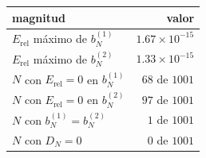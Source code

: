 \begin{tabular}{lr}
\toprule
magnitud & valor \\
\midrule
$E_\mathrm{rel}$ máximo de $b_N^{(1)}$ & $1.67 \times 10^{-15}$ \\
$E_\mathrm{rel}$ máximo de $b_N^{(2)}$ & $1.33 \times 10^{-15}$ \\
$N$ con $E_\mathrm{rel} = 0$ en $b_N^{(1)}$ & $68$ de $1001$ \\
$N$ con $E_\mathrm{rel} = 0$ en $b_N^{(2)}$ & $97$ de $1001$ \\
$N$ con $b_N^{(1)} = b_N^{(2)}$ & $1$ de $1001$ \\
$N$ con $D_N = 0$ & $0$ de $1001$ \\
\bottomrule
\end{tabular}
